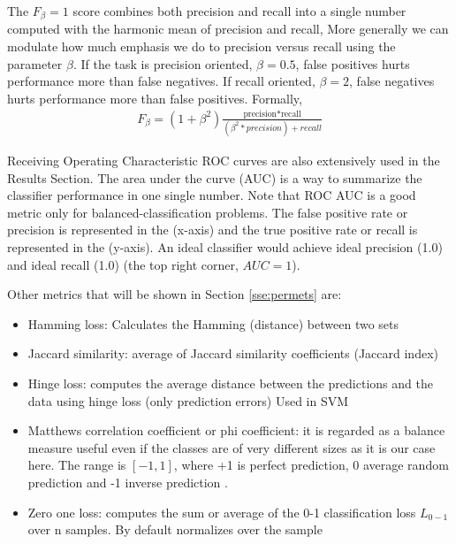 \documentclass[11pt]{article}
\theoremstyle{definition}
\theoremstyle{remark}
\begin{document}
The $F_{\beta}=1$ score combines both precision and recall into a single number computed with the harmonic mean of precision and recall, More generally we can modulate how much emphasis we do to precision versus recall using the parameter $\beta$. 
If the task is precision oriented, $\beta=0.5$, false positives hurts performance more than false negatives. If recall oriented, $\beta=2$, false negatives hurts performance more than false positives. Formally, 
\begin{equation*}
\begin{split}
F_{\beta} = (1+\beta^2)\frac{\text{precision*recall}}{(\beta^2 * precision)+recall} 
\end{split}
\end{equation*}


Receiving Operating Characteristic ROC curves are also extensively used in the Results Section. The area under the curve (AUC) is a way to summarize the classifier performance in one single number. Note that ROC AUC is a good metric only for balanced-classification problems. The false positive rate or precision is represented in the (x-axis) and the true positive rate or recall is represented in the (y-axis). An ideal classifier would achieve ideal precision (1.0) and ideal recall (1.0) (the top right corner, $AUC=1$).

Other metrics that will be shown in Section \ref{sse:permets} are:
\begin{itemize}
	\item Hamming loss: Calculates the Hamming (distance) between two sets
	\item Jaccard similarity: average of Jaccard similarity coefficients (Jaccard index)
	\item Hinge loss: computes the average distance between the predictions and the data using hinge loss (only prediction errors) Used in SVM
	\item Matthews correlation coefficient or phi coefficient: it is regarded as a balance measure useful even if the classes are of very different sizes as it is our case here. The range is $[-1,1]$, where +1 is perfect prediction, 0 average random prediction and -1 inverse prediction \cite{boughorbel2017optimal}. %
	\item Zero one loss: computes the sum or average of the 0-1 classification loss $L_{0-1}$ over n samples. By default normalizes over the sample
\end{itemize}
\end{document}
